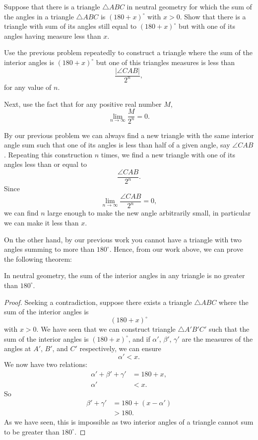 \documentclass[noauthor,nooutcomes,12pt,hints,handout,newpage]{ximera}
\begin{document}
\begin{problem}
\label{121} Suppose that there is a triangle $\triangle ABC$ in
neutral geometry for which the sum of the angles in a triangle $\triangle
ABC$ is $\left( 180+x\right)^\circ$ with $x>0$. Show that there is a
triangle with sum of its angles still equal to $\left(180+x\right)^\circ$
but with one of its angles having measure less than $x$. %


\begin{hint}
Use the previous problem repeatedly to construct a triangle where the sum of the
interior angles is $(180+x)^\circ$ but one of this triangles measures is less than
\[
\frac{|\angle CAB|}{2^n},
\]
for any value of $n$.
\end{hint}
\begin{hint}
Next, use the fact that for any positive real number $M$,
\[
\lim_{n\to \infty}\frac{M}{2^n} = 0.
\]
\end{hint}
\begin{freeResponse}
By our previous problem we can always find a new triangle with the
same interior angle sum such that one of its angles is less than half
of a given angle, say $\angle CAB$. Repeating this construction $n$
times, we find a new triangle with one of its angles less than or
equal to
\[
\frac{\angle CAB}{2^n}.
\]
Since 
\[
\lim_{n\to \infty}\frac{\angle CAB}{2^n} = 0,
\]
we can find $n$ large enough to make the new angle arbitrarily small, in
particular we can make it less than $x$.
\end{freeResponse}

\end{problem}


On the other hand, by our previous work
you cannot have a triangle with two angles summing to more than
$180^\circ$. Hence, from our work above, we can prove the following
theorem:

\begin{theorem}
In neutral geometry, the sum of the interior angles in any triangle is no greater
than $180^\circ$.
\end{theorem}

\begin{proof}
Seeking a contradiction, suppose there exists a triangle $\triangle
ABC$ where the sum of the interior angles is 
\[
\left(180+x\right)^\circ
\]
with $x>0$. We have seen that we can construct triangle $\triangle
A'B'C'$ such that the sum of the interior angles is $(180+x)^\circ$,
and if $\alpha'$, $\beta'$, $\gamma'$ are the measures of the angles
at $A'$, $B'$, and $C'$ respectively, we can ensure 
\[
\alpha' < x.
\]
We now have two relations:
\begin{align*}
\alpha' + \beta' + \gamma' &= 180 + x,\\
\alpha' &< x.
\end{align*}
So%
\begin{align*}
\beta'+\gamma'&=180+\left(x-\alpha'\right)\\
&>180.
\end{align*}
As we have seen, this is impossible as two interior angles of a
triangle cannot sum to be greater than $180^\circ$.
\end{proof}
\end{document}
